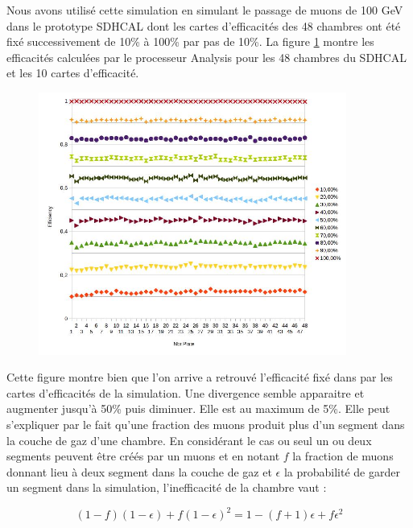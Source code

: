 Nous avons utilisé cette simulation en simulant le passage de muons de 100 GeV dans le prototype SDHCAL dont les cartes d'efficacités des 48 chambres ont été fixé successivement de 10\% à 100\% par pas de 10\%. La figure \ref{effisimul} montre les efficacités calculées par le processeur Analysis pour les 48 chambres du SDHCAL et les 10 cartes d'efficacité.

\begin{figure}[ht!]
	\centering
	\includegraphics[width=0.9\textwidth]{GLA/effisimul.jpg}
	\label{effisimul}
\end{figure}

Cette figure montre bien que l'on arrive a retrouvé l'efficacité fixé dans par les cartes d'efficacités de la simulation. Une divergence semble apparaitre et augmenter jusqu'à 50\% puis diminuer. Elle est au maximum de 5\%. Elle peut s'expliquer par le fait qu'une fraction des muons produit plus d'un segment dans la couche de gaz d'une chambre. En considérant le cas ou seul un ou deux segments peuvent être créés par un muons et en notant $f$ la fraction de muons donnant lieu à deux segment dans la couche de gaz et $\epsilon$ la probabilité de garder un segment dans la simulation, l'inefficacité de la chambre vaut :

\begin{equation}
(1-f)(1-\epsilon)+f(1-\epsilon)^2=1-(f+1)\epsilon+f\epsilon^2 \label{equa1}
\end{equation}

